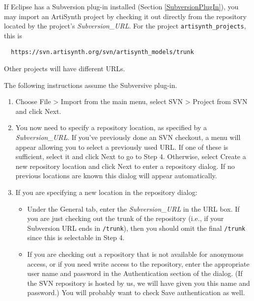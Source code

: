 If Eclipse has a Subversion plug-in installed (Section
\ref{SubversionPlugIn}), you may import an ArtiSynth project by
checking it out directly from the repository located by the project's
{\it Subversion\_URL}. For the project {\tt artisynth\_projects}, this
is
\begin{verbatim}
  https://svn.artisynth.org/svn/artisynth_models/trunk
\end{verbatim}
Other projects will have different URLs.

The following instructions assume the Subversive plug-in.

\begin{enumerate}

\item Choose {\sf File > Import} from the main menu, select {\sf SVN >
Project from SVN} and click {\sf Next}.

\item You now need to specify a repository location, as specified by a
{\it Subversion\_URL}.  If you've previously done an SVN checkout, a
menu will appear allowing you to select a previously used URL. If one
of these is sufficient, select it and click {\sf Next} to go to Step
4. Otherwise, select {\sf Create a new repository location} and click
{\sf Next} to enter a repository dialog. If no previous locations are
known this dialog will appear automatically.

\item If you are specifying a new location in the repository dialog:

\begin{itemize}

\item Under the {\sf General} tab, enter the {\it Subversion\_URL} in the
{\sf URL} box. If you are just checking out the trunk of the
repository (i.e., if your Subversion URL ends in {\tt /trunk}), then
you should omit the final {\tt /trunk} since this is selectable in Step 4.

\item If you are checking out a repository that is not available for
anonymous access, or if you need write access to the repository, enter
the appropriate user name and password in the {\sf Authentication}
section of the dialog. (If the SVN repository is hosted by us, we will
have given you this name and password.) You will probably want to
check {\sf Save authentication} as well.



\end{itemize}
\end{enumerate}
